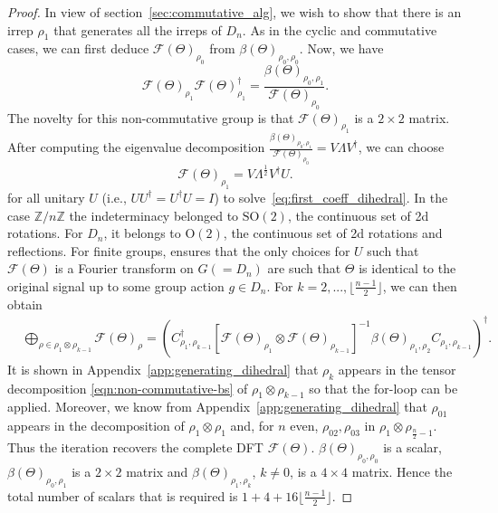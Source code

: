 \documentclass{article}
\theoremstyle{plain}
\theoremstyle{definition}
\theoremstyle{remark}
\begin{document}
\begin{proof}
In view of section~\ref{sec:commutative_alg}, we wish to show that there is an irrep $\rho_1$ that generates all the irreps of $D_n$. As in the cyclic and commutative cases, we can first deduce $\mathcal{F}(\Theta)_{\rho_0}$ from $\beta(\Theta)_{\rho_0,\rho_0}$. Now, we have
\begin{equation}\label{eq:first_coeff_dihedral}
    \mathcal{F}(\Theta)_{\rho_1}\mathcal{F}(\Theta)_{\rho_1}^\dagger=\frac{\beta(\Theta)_{\rho_0,\rho_1}}{\mathcal{F}(\Theta)_{\rho_0}}.
\end{equation}
The novelty for this non-commutative group is that $\mathcal{F}(\Theta)_{\rho_1}$ is a $2\times 2$ matrix. After computing the eigenvalue decomposition $\frac{\beta(\Theta)_{\rho_0,\rho_1}}{\mathcal{F}(\Theta)_{\rho_0}} = V\Lambda V^\dagger$, we can choose
\begin{equation}
    \mathcal{F}(\Theta)_{\rho_1} = V\Lambda^{\frac{1}{2}}V^\dagger U.
\end{equation}
for all unitary $U$ (i.e., $UU^\dagger=U^\dagger U=I$) to solve~\eqref{eq:first_coeff_dihedral}. In the case $\mathbb{Z}/n\mathbb{Z}$ the indeterminacy belonged to $\mathrm{SO}(2)$, the continuous set of 2d rotations. For $D_n$, it belongs to $\mathrm{O}(2)$, the continuous set of 2d rotations and reflections. For finite groups, \citet{kakarala_thesis} ensures that the only choices for $U$ such that $\mathcal{F}(\Theta)$ is a Fourier transform on $G(=D_n)$ are such that $\Theta$ is identical to the original signal up to some group action $g\in D_n$. %
For $k=2,...,\lfloor \frac{n-1}{2}\rfloor$, we can then obtain
\begin{align}
    \label{eq:new_coeff_dihedral}
    &\bigoplus_{\rho\in\rho_1\otimes\rho_{k-1}}\mathcal{F}(\Theta)_\rho =\left(C_{\rho_1,\rho_{k-1}}^{\dagger}\left[\mathcal{F}(\Theta)_{\rho_1}\otimes\mathcal{F}(\Theta)_{\rho_{k-1}}\right]^{-1}\beta(\Theta)_{\rho_1,\rho_2}C_{\rho_1,\rho_{k-1}}\right)^\dagger.
\end{align}
It is shown in Appendix~\ref{app:generating_dihedral} that $\rho_k$ appears in the tensor decomposition \eqref{eqn:non-commutative-bs} of $\rho_1\otimes\rho_{k-1}$ so that the for-loop can be applied. Moreover, we know from Appendix~\ref{app:generating_dihedral} that $\rho_{01}$ appears in the decomposition of $\rho_1\otimes\rho_{1}$ and, for $n$ even, $\rho_{02}, \rho_{03}$ in $ \rho_1\otimes\rho_{\frac{n}{2}-1}$. Thus the iteration recovers the complete DFT $\mathcal{F}(\Theta)$. $\beta(\Theta)_{\rho_0,\rho_0}$ is a scalar, $\beta(\Theta)_{\rho_0,\rho_1}$ is a $2\times 2$ matrix and $ \beta(\Theta)_{\rho_1,\rho_k}$, $k\neq 0$, is a $4\times 4$ matrix. Hence the total number of scalars that is required is $1+4+16\lfloor\frac{n-1}{2}\rfloor$.
\end{proof}
\end{document}
